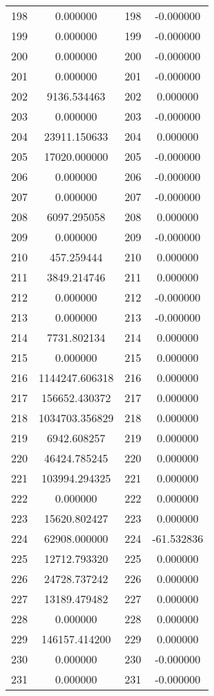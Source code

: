 \documentclass[12pt]{article}
\begin{document}
\begin{longtable}{@{}cccc@{}}
198 & 0.000000 & 198 & -0.000000 \\
199 & 0.000000 & 199 & -0.000000 \\
200 & 0.000000 & 200 & -0.000000 \\
201 & 0.000000 & 201 & -0.000000 \\
202 & 9136.534463 & 202 & 0.000000 \\
203 & 0.000000 & 203 & -0.000000 \\
204 & 23911.150633 & 204 & 0.000000 \\
205 & 17020.000000 & 205 & -0.000000 \\
206 & 0.000000 & 206 & -0.000000 \\
207 & 0.000000 & 207 & -0.000000 \\
208 & 6097.295058 & 208 & 0.000000 \\
209 & 0.000000 & 209 & -0.000000 \\
210 & 457.259444 & 210 & 0.000000 \\
211 & 3849.214746 & 211 & 0.000000 \\
212 & 0.000000 & 212 & -0.000000 \\
213 & 0.000000 & 213 & -0.000000 \\
214 & 7731.802134 & 214 & 0.000000 \\
215 & 0.000000 & 215 & 0.000000 \\
216 & 1144247.606318 & 216 & 0.000000 \\
217 & 156652.430372 & 217 & 0.000000 \\
218 & 1034703.356829 & 218 & 0.000000 \\
219 & 6942.608257 & 219 & 0.000000 \\
220 & 46424.785245 & 220 & 0.000000 \\
221 & 103994.294325 & 221 & 0.000000 \\
222 & 0.000000 & 222 & 0.000000 \\
223 & 15620.802427 & 223 & 0.000000 \\
224 & 62908.000000 & 224 & -61.532836 \\
225 & 12712.793320 & 225 & 0.000000 \\
226 & 24728.737242 & 226 & 0.000000 \\
227 & 13189.479482 & 227 & 0.000000 \\
228 & 0.000000 & 228 & 0.000000 \\
229 & 146157.414200 & 229 & 0.000000 \\
230 & 0.000000 & 230 & -0.000000 \\
231 & 0.000000 & 231 & -0.000000 \\

\end{longtable}
\end{document}
